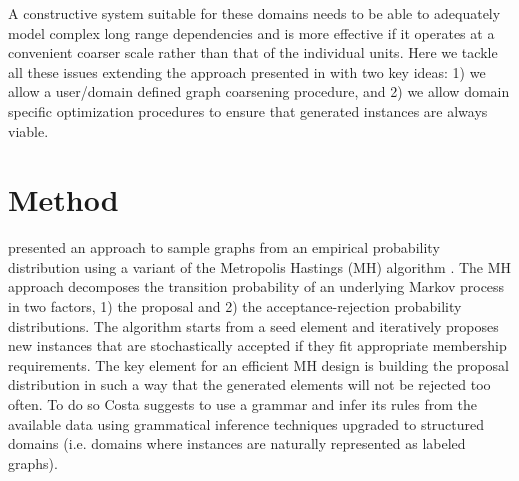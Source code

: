 \documentclass{article}
\begin{document}
A constructive system suitable for these domains needs to be able to
adequately model complex long range dependencies and is more effective if it
operates at a convenient coarser scale rather than that of the individual
units. Here we tackle all these issues extending the approach presented in
\cite{costa16} with two key ideas: 1) we allow a user/domain defined graph
coarsening procedure, and 2) we allow domain specific optimization procedures
to ensure that generated instances are always viable.


\section{Method}

\cite{costa16} presented an approach to sample graphs from an empirical
probability distribution using a variant of the Metropolis Hastings (MH)
algorithm \citep{metropolis1953equation}. The MH approach decomposes the
transition probability of an underlying  Markov process in two factors, 1) the
proposal  and 2) the acceptance-rejection probability distributions. The
algorithm starts from a seed element and iteratively proposes new instances
that are stochastically accepted if they fit appropriate membership
requirements. The key element for an efficient MH design is building the
proposal distribution in such a way that the generated elements will not be
rejected too often. To do so Costa suggests to use a grammar and infer its
rules from the available data using grammatical inference techniques upgraded
to structured domains (i.e. domains where instances are naturally represented
as labeled graphs).
\end{document}
